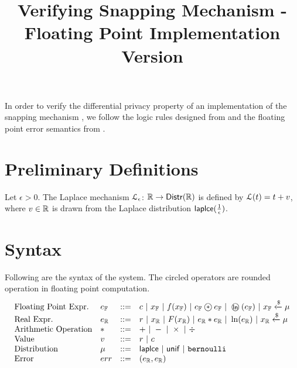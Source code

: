 \documentclass[a4paper,11pt]{article}
\begin{document}
\title{Verifying Snapping Mechanism - Floating Point Implementation Version}
\author{}

\date{}

\maketitle
In order to verify the differential privacy property of an implementation of the snapping mechanism \cite{mironov2012significance}, we follow the logic rules designed from \cite{barthe2016proving} and the floating point error semantics from \cite{Ramananandro2016unified,Martel2006higher,Becker2018verified,Moscato2017Automatic}.

\section{Preliminary Definitions}
\begin{defn}
Let $\epsilon > 0$. The Laplace mechanism  $\mathcal{L}_{\epsilon}$: $\mathbb{R} \to \mathsf{Distr}(\mathbb{R})$ is defined by $\mathcal{L}(t) = t + v$, where $v \in \mathbb{R}$ is drawn from the Laplace distribution $\mathsf{laplce}(\frac{1}{\epsilon})$.
\end{defn}
%
%
%
\section{Syntax}
Following are the syntax of the system. The circled operators are rounded operation in floating point computation.
\[\begin{array}{llll}
\mbox{Floating Point Expr.} & \fexpr & ::= & \fval
	~|~ \fvarx ~|~ f(\fvarx) ~|~ \fexpr \oop \fexpr
	~|~ \oln (\fexpr) ~|~ \fvarx \samplel \edistr \\
%
\mbox{Real Expr.} & \rexpr & ::= & \rval
	~|~ \rvarx ~|~ F(\rvarx) ~|~ \rexpr * \rexpr
	~|~ \ln (\rexpr) ~|~ \rvarx \samplel \edistr \\
%
\mbox{Arithmetic Operation} & * & ::= & + ~|~ - ~|~ \times ~|~ \div \\
%
\mbox{Value} & \valv & ::= & \rval ~|~  \fval \\
%
\mbox{Distribution} & \edistr & ::= & \laplace ~|~ \uniform ~|~ \bernoulli \\ 
%
\mbox{Error} & \err & ::= & (\rexpr, \rexpr) \\

\end{array}\]
\end{document}
